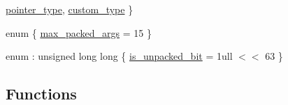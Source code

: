\begin{DoxyCompactItemize}
\hyperlink{namespaceinternal_a8661864098ac0acff9a6dd7e66f59038a4ac7f97a77c6b76b4205e30c86980275}{pointer\+\_\+type}, 
\hyperlink{namespaceinternal_a8661864098ac0acff9a6dd7e66f59038a7f81f24620187ebe99e60e9e42ab9b15}{custom\+\_\+type}
 \}
\item 
enum \{ \hyperlink{namespaceinternal_a7f3ac89c89503ec2e08800b69e0e6934a1868fd9ce8f55804389e2ef50fa5901c}{max\+\_\+packed\+\_\+args} = 15
 \}
\item 
enum \+: unsigned long long \{ \hyperlink{namespaceinternal_aa0ebf6bf81922f0239a461c5b2fd9bc7aa369fe459d2605e7f4d98f40111d23aa}{is\+\_\+unpacked\+\_\+bit} = 1ull $<$$<$ 63
 \}
\end{DoxyCompactItemize}
\subsection*{Functions}
